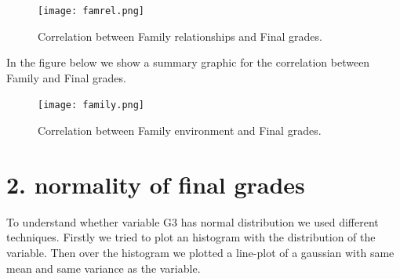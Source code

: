 \documentclass[a4paper, 11pt]{report}
\theoremstyle{definition}
\numberwithin{equation}{section}		%
\numberwithin{figure}{section}			%
\numberwithin{table}{section}				%
\begin{document}
\begin{itemize}
\begin{figure}[h]\centering
\texttt{[image: famrel.png]}
\caption{Correlation between Family relationships and Final grades.}
\end{figure}


In the figure below we show a summary graphic for the correlation between Family and Final grades.
\begin{figure}[h]\centering
\texttt{[image: family.png]}
\caption{Correlation between Family environment and Final grades.}
\end{figure}



\end{itemize}




\section*{2. normality of final grades}

To understand whether variable G3 has normal distribution we used different
techniques. Firstly we tried to plot an histogram with the distribution of the variable. Then over the histogram we plotted a line-plot of a gaussian with same mean and same variance as the variable.
\end{document}
